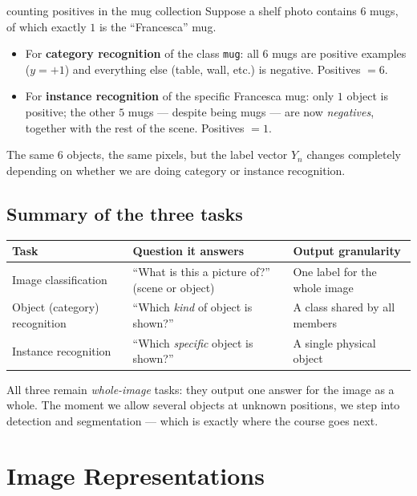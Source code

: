 \documentclass{report}
\begin{document}
\begin{exbox}{counting positives in the mug collection}
Suppose a shelf photo contains $6$ mugs, of which exactly $1$ is the
``Francesca'' mug.
\begin{itemize}
\item For \textbf{category recognition} of the class \texttt{mug}: all $6$
mugs are positive examples ($y=+1$) and everything else (table, wall, etc.) is
negative. Positives $=6$.
\item For \textbf{instance recognition} of the specific Francesca mug: only
$1$ object is positive; the other $5$ mugs --- despite being mugs --- are now
\emph{negatives}, together with the rest of the scene. Positives $=1$.
\end{itemize}
The same $6$ objects, the same pixels, but the label vector $Y_n$ changes
completely depending on whether we are doing category or instance recognition.
\end{exbox}

\subsection{Summary of the three tasks}

\begin{center}
\renewcommand{\arraystretch}{1.4}
\begin{tabular}{@{}p{3.6cm} p{5.5cm} p{4.2cm}@{}}
\toprule
\textbf{Task} & \textbf{Question it answers} & \textbf{Output granularity}\\
\midrule
Image classification & ``What is this a picture of?'' (scene or object) &
One label for the whole image\\
Object (category) recognition & ``Which \emph{kind} of object is shown?'' &
A class shared by all members\\
Instance recognition & ``Which \emph{specific} object is shown?'' &
A single physical object\\
\bottomrule
\end{tabular}
\end{center}

All three remain \emph{whole-image} tasks: they output one answer for the image
as a whole. The moment we allow several objects at unknown positions, we step
into detection and segmentation --- which is exactly where the course goes
next.


\section{Image Representations}
\end{document}
